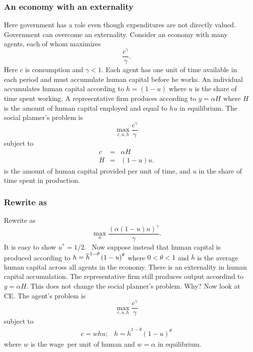 \documentclass[aspectratio=169]{ltx-talk}
\begin{document}
\begin{frame}
\frametitle{An economy with an externality}
Here government has a role even though expenditures are not directly valued.
Government can overcome an externality. Consider an economy with many
agents, each of whom maximizes 
\begin{equation*}
\frac{c^{\gamma }}{\gamma }.
\end{equation*}%
Here $c$ is consumption and $\gamma <1.$ Each agent has one unit of time
available in each period and must accumulate human capital before he works.
An individual accumulates human capital according to $h=\left( 1-u\right) $
where $u$ is the share of time spent working$.$ A representative firm
produces according to $y=\alpha H$ where $H$ is the amount of human capital
employed and equal to $hu$ in equilibrium. The social planner's problem is $%
\ $%
\begin{equation*}
\underset{c,u,h}{\max }\frac{c^{\gamma }}{\gamma }
\end{equation*}%
subject to 
\begin{eqnarray*}
c &=&\alpha H \\
H &=&\left( 1-u\right) u.
\end{eqnarray*}%
is the amount of human capital provided per unit of time, and $u$ in the
share of time spent in production.
\end{frame}

\begin{frame}
\frametitle{Rewrite as}
Rewrite as%
\begin{equation*}
\underset{u}{\max }\frac{\left( \alpha (1-u)u\right) ^{\gamma }}{\gamma }.
\end{equation*}%
It is easy to show $u^{\ast }=1/2$.\ \newline
Now suppose instead that human capital is produced according to $h=\overline{%
h}^{1-\theta }\left( 1-u\right) ^{\theta }$ where $0<\theta <1$ and $%
\overline{h}$ is the average human capital across all agents in the economy.
There is an externality in human capital accumulation. The representative
firm still produces output accordind to $y=\alpha H.$ This does not change
the social planner's problem. Why? Now look at CE. The agent's problem is%
\begin{equation*}
\underset{c,u,h}{\max }\frac{c^{\gamma }}{\gamma }
\end{equation*}%
subject to 
\begin{equation*}
\begin{array}{ll}
c=whu; & h=\overline{h}^{1-\theta }\left( 1-u\right) ^{\theta }%
\end{array}%
\end{equation*}%
where $w$ is the wage\ per unit of human and $w=\alpha $ in
equilibrium.
\end{frame}
\end{document}
